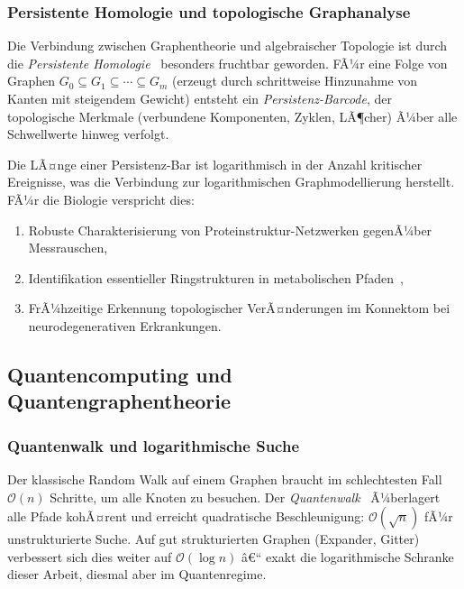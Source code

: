 ﻿\documentclass[12pt,a4paper,twoside]{article}
\theoremstyle{definition}
\theoremstyle{plain}
\theoremstyle{remark}
\begin{document}
\subsubsection{Persistente Homologie und topologische Graphanalyse}

Die Verbindung zwischen Graphentheorie und algebraischer Topologie
ist durch die \emph{Persistente Homologie}~\cite{Edelsbrunner2002}
besonders fruchtbar geworden.  FÃ¼r eine Folge von Graphen
$G_0 \subseteq G_1 \subseteq \cdots \subseteq G_m$ (erzeugt durch
schrittweise Hinzunahme von Kanten mit steigendem Gewicht) entsteht
ein \emph{Persistenz-Barcode}, der topologische Merkmale (verbundene
Komponenten, Zyklen, LÃ¶cher) Ã¼ber alle Schwellwerte hinweg verfolgt.

Die LÃ¤nge einer Persistenz-Bar ist logarithmisch in der Anzahl
kritischer Ereignisse, was die Verbindung zur logarithmischen
Graphmodellierung herstellt.  FÃ¼r die Biologie verspricht dies:
\begin{enumerate}
  \item Robuste Charakterisierung von Proteinstruktur-Netzwerken
        gegenÃ¼ber Messrauschen,
  \item Identifikation essentieller Ringstrukturen in
        metabolischen Pfaden~\cite{Wagner2001},
  \item FrÃ¼hzeitige Erkennung topologischer VerÃ¤nderungen im
        Konnektom bei neurodegenerativen Erkrankungen.
\end{enumerate}

\subsection{Quantencomputing und Quantengraphentheorie}
\label{sub:quantum}

\subsubsection{Quantenwalk und logarithmische Suche}

Der klassische Random Walk auf einem Graphen braucht im
schlechtesten Fall $\mathcal{O}(n)$ Schritte, um alle Knoten
zu besuchen.  Der \emph{Quantenwalk}~\cite{Aharonov2001}
Ã¼berlagert alle Pfade kohÃ¤rent und erreicht quadratische
Beschleunigung: $\mathcal{O}(\sqrt{n})$ fÃ¼r unstrukturierte
Suche.  Auf gut strukturierten Graphen (Expander, Gitter)
verbessert sich dies weiter auf $\mathcal{O}(\log n)$
â€“ exakt die logarithmische Schranke dieser Arbeit, diesmal
aber im Quantenregime.
\end{document}
